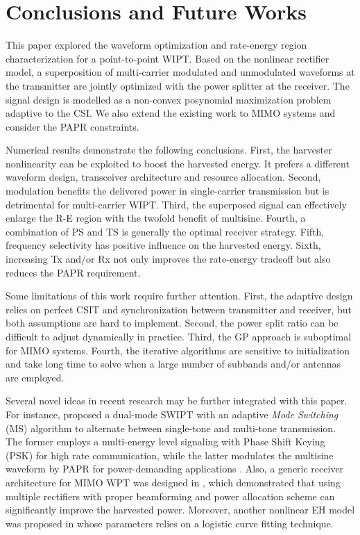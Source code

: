 \chapter{Conclusions and Future Works}
This paper explored the waveform optimization and rate-energy region characterization for a point-to-point WIPT. Based on the nonlinear rectifier model, a superposition of multi-carrier modulated and unmodulated waveforms at the transmitter are jointly optimized with the power splitter at the receiver. The signal design is modelled as a non-convex posynomial maximization problem adaptive to the CSI. We also extend the existing work to MIMO systems and consider the PAPR constraints.

Numerical results demonstrate the following conclusions. First, the harvester nonlinearity can be exploited to boost the harvested energy. It prefers a different waveform design, transceiver architecture and resource allocation. Second, modulation benefits the delivered power in single-carrier transmission but is detrimental for multi-carrier WIPT. Third, the superposed signal can effectively enlarge the R-E region with the twofold benefit of multisine. Fourth, a combination of PS and TS is generally the optimal receiver strategy. Fifth, frequency selectivity has positive influence on the harvested energy. Sixth, increasing Tx and/or Rx not only improves the rate-energy tradeoff but also reduces the PAPR requirement.

Some limitations of this work require further attention. First, the adaptive design relies on perfect CSIT and synchronization between transmitter and receiver, but both assumptions are hard to implement. Second, the power split ratio can be difficult to adjust dynamically in practice. Third, the GP approach is suboptimal for MIMO systems. Fourth, the iterative algorithms are sensitive to initialization and take long time to solve when a large number of subbands and/or antennas are employed.

Several novel ideas in recent research may be further integrated with this paper. For instance, \cite{Park2018} proposed a dual-mode SWIPT with an adaptive \textit{Mode Switching} (MS) algorithm to alternate between single-tone and multi-tone transmission. The former employs a multi-energy level signaling with Phase Shift Keying (PSK) for high rate communication, while the latter modulates the multisine waveform by PAPR for power-demanding applications \cite{Krikidis2019}. Also, a generic receiver architecture for MIMO WPT was designed in \cite{Ma2019}, which demonstrated that using multiple rectifiers with proper beamforming and power allocation scheme can significantly improve the harvested power. Moreover, another nonlinear EH model was proposed in \cite{Boshkovska2015} whose parameters relies on a logistic curve fitting technique.